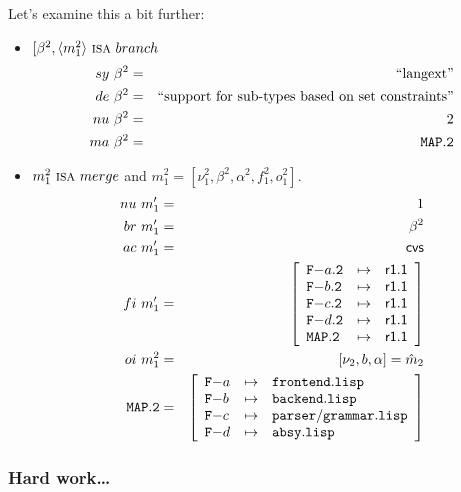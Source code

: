\documentclass[fleqn, 10pt, a4paper]{article}
\begin{document}
Let's examine this a bit further:
\begin{itemize}
\item $[\beta^2, \langle m_1^2 \rangle\ \mbox{\textsc{isa}}\ \mathnormal{branch}$
\begin{eqnarray*}
\mathnormal{sy}\ \beta^2 &=& \mbox{``langext''} \\
\mathnormal{de}\ \beta^2 &=& \mbox{``support for sub-types based on set constraints''} \\
\mathnormal{nu}\ \beta^2 &=& 2 \\
\mathnormal{ma}\ \beta^2 &=& \mathtt{MAP.2}
\end{eqnarray*}

\item $m_1^2\ \mbox{\textsc{isa}}\ \mathnormal{merge}$ and
$m_1^2=[\nu_1^2, \beta^2, \alpha^2, f_1^2, o_1^2]$.
\begin{eqnarray*}
\mathnormal{nu}\ m'_1 &=& 1 \\
\mathnormal{br}\ m'_1 &=& \beta^2 \\
\mathnormal{ac}\ m'_1 &=& \mathsf{cvs} \\
\mathnormal{fi}\ m'_1 &=& \left[
\begin{array}{lcl}
\mathtt{F-}a\mathtt{.2} & \mapsto & \mathsf{r1.1} \\
\mathtt{F-}b\mathtt{.2} & \mapsto & \mathsf{r1.1} \\
\mathtt{F-}c\mathtt{.2} & \mapsto & \mathsf{r1.1} \\
\mathtt{F-}d\mathtt{.2} & \mapsto & \mathsf{r1.1} \\
\mathtt{MAP.2}         & \mapsto & \mathsf{r1.1} \\
\end{array}\right] \\
\mathnormal{oi}\ m_1^2 &=& [\nu_2, b, \alpha] = \hat m_2 \\
\mathtt{MAP.2} &=& \left[
\begin{array}{lcl}
\mathtt{F-}a &\mapsto& \mathtt{frontend.lisp} \\
\mathtt{F-}b &\mapsto& \mathtt{backend.lisp} \\
\mathtt{F-}c &\mapsto& \mathtt{parser/grammar.lisp} \\
\mathtt{F-}d &\mapsto& \mathtt{absy.lisp} \\
\end{array}\right]
\end{eqnarray*}
\end{itemize}

\subsubsection{Hard work\ldots}
\end{document}
